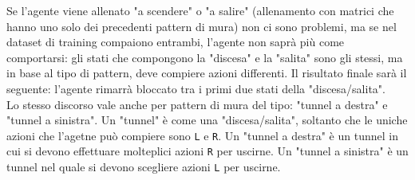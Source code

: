 Se l'agente viene allenato "a scendere" o "a salire" (allenamento con matrici che hanno uno solo dei precedenti pattern di mura) non ci sono problemi, ma se nel dataset di training compaiono entrambi, l'agente non sapr\`{a} pi\`{u} come comportarsi: gli stati che compongono la "discesa" e la "salita" sono gli stessi, ma in base al tipo di pattern, deve compiere azioni differenti. Il risultato finale sar\`{a} il seguente: l'agente rimarr\`{a} bloccato tra i primi due stati della "discesa/salita".\\

Lo stesso discorso vale anche per pattern di mura del tipo: "tunnel a destra" e "tunnel a sinistra". Un "tunnel" \`{e} come una "discesa/salita", soltanto che le uniche azioni che l'agetne pu\`{o} compiere sono \lstinline[style=cmd]|L| e \lstinline[style=cmd]|R|. Un "tunnel a destra" \`{e} un tunnel in cui si devono effettuare molteplici azioni  \lstinline[style=cmd]|R| per uscirne. Un "tunnel a sinistra" \`{e} un tunnel nel quale si devono scegliere azioni  \lstinline[style=cmd]|L| per uscirne.


